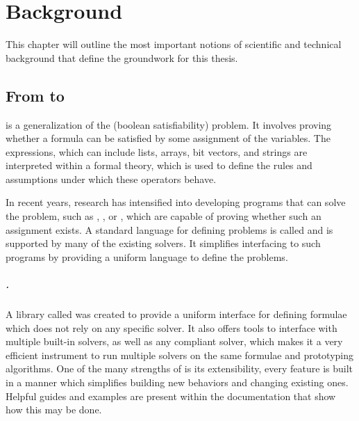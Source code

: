 \chapter{Background}
\label{ch:background}
This chapter will outline the most important notions of scientific and technical background that define the groundwork for this thesis.

\section{From \smt{} to \vmt{}}

\SMT{} is a generalization of the \sat{} (boolean satisfiability) problem.
It involves proving whether a formula can be satisfied by some assignment of the variables.
The expressions, which can include lists, arrays, bit vectors, and strings are interpreted within a formal theory, which is used to define the rules and assumptions under which these operators behave.

In recent years, research has intensified into developing programs that can solve the \smt{} problem, such as \zthree{} \cite{DBLP:conf/tacas/MouraB08}, \yices{} \cite{DBLP:conf/cav/Dutertre14}, or \mathsat{} \cite{DBLP:conf/tacas/CimattiGSS13}, which are capable of proving whether such an assignment exists.
A standard language for defining \smt{} problems is called \smtlib{} \cite{BarFT-SMTLIB} and is supported by many of the existing solvers.
It simplifies interfacing to such programs by providing a uniform language to define the problems.

\paragraph*{\pysmt{}.}
A \python{} library called \pysmt{} \cite{pysmt2015} was created to provide a uniform interface for defining \smt{} formulae which does not rely on any specific solver.
It also offers tools to interface with multiple built-in solvers, as well as any \smtlib{} compliant solver, which makes it a very efficient instrument to run multiple solvers on the same formulae and prototyping algorithms.
One of the many strengths of \pysmt{} is its extensibility, every feature is built in a manner which simplifies building new behaviors and changing existing ones.
Helpful guides and examples are present within the documentation that show how this may be done.

